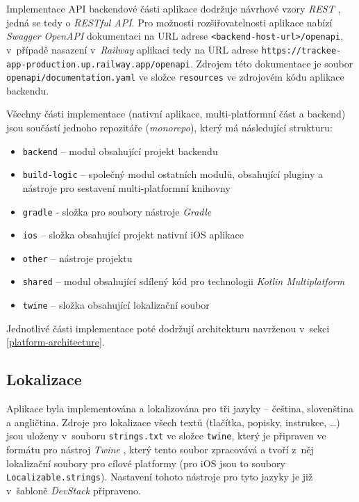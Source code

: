 Implementace API backendové části aplikace dodržuje návrhové vzory \emph{REST} \cite{rest-api}, jedná se tedy o \emph{RESTful API}. Pro možnosti rozšiřovatelnosti aplikace nabízí \emph{Swagger OpenAPI} dokumentaci \cite{swagger-open-api} na URL adrese \texttt{<backend-host-url>/openapi}, v~případě nasazení v~\emph{Railway} aplikaci tedy na URL adrese \texttt{https://trackee-app-production.up.railway.app/openapi}. Zdrojem této dokumentace je soubor \texttt{openapi/documentation.yaml} ve složce \texttt{resources} ve zdrojovém kódu aplikace backendu.

Všechny části implementace (nativní aplikace, multi-platformní část a backend) jsou součástí jednoho repozitáře (\emph{monorepo}), který má následující strukturu:
\begin{itemize}
\item\texttt{backend} – modul obsahující projekt backendu
\item\texttt{build-logic} – společný modul ostatních modulů, obsahující pluginy a nástroje pro sestavení multi-platformní knihovny
\item\texttt{gradle} - složka pro soubory nástroje \emph{Gradle}
\item\texttt{ios} – složka obsahující projekt nativní iOS aplikace
\item\texttt{other} – nástroje projektu
\item\texttt{shared} – modul obsahující sdílený kód pro technologii \emph{Kotlin Multiplatform}
\item\texttt{twine} – složka obsahující lokalizační soubor
\end{itemize}
Jednotlivé části implementace poté dodržují architekturu navrženou v~sekci \ref{platform-architecture}.

\subsection{Lokalizace}

Aplikace byla implementována a lokalizována pro tři jazyky – čeština, slovenština a angličtina. Zdroje pro lokalizace všech textů (tlačítka, popisky, instrukce, \dots) jsou uloženy v~souboru \texttt{strings.txt} ve složce \texttt{twine}, který je připraven ve formátu pro nástroj \emph{Twine} \cite{twine}, který tento soubor zpracovává a tvoří z~něj lokalizační soubory pro cílové platformy (pro iOS jsou to soubory \texttt{Localizable.strings}). Nastavení tohoto nástroje pro tyto jazyky je již v~šabloně \emph{DevStack} připraveno.

